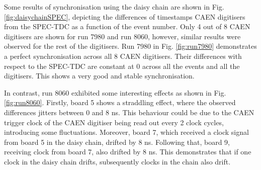 Some results of synchronisation using the daisy chain are shown in Fig. \ref{fig:daisychainSPEC}, depicting the differences of timestamps CAEN digitisers from the SPEC-TDC as a function of the event 
number.
Only 4 out of 8 CAEN digitisers are shown for run 7980 and run 8060, however, similar results were observed for the rest of the digitisers.
Run 7980 in Fig. \ref{fig:run7980} demonstrates a perfect synchronisation across all 8 CAEN digitisers.
Their differences with respect to the SPEC-TDC are constant at 0 across all the events and all the digitisers.
This shows a very good and stable synchronisation.

In contrast, run 8060 exhibited some interesting effects as shown in Fig. \ref{fig:run8060}.
Firstly, board 5 shows a straddling effect, where the observed differences jitters between 0 and 8 ns.
This behaviour could be due to the CAEN trigger clock of the CAEN digitiser being read out every 2 clock cycles, introducing some fluctuations.
Moreover, board 7, which received a clock signal from board 5 in the daisy chain, drifted by 8 ns.
Following that, board 9, receiving clock from board 7, also drifted by 8 ns. 
This demonstrates that if one clock in the daisy chain drifts, subsequently clocks in the chain also drift.

